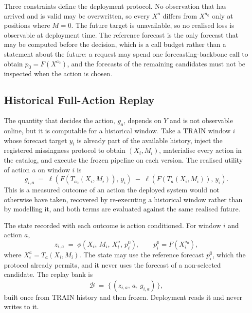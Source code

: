 \documentclass{article}
\newcommand{\calB}{\mathcal{B}}
\newcommand{\loss}{\ell}
\begin{document}
Three constraints define the deployment protocol. No observation that has arrived and is valid
may be overwritten, so every $X^{a}$ differs from $X^{a_0}$ only at positions where $M = 0$.
The future target is unavailable, so no realised loss is observable at deployment time. The
reference forecast is the only forecast that may be computed before the decision, which is a
call budget rather than a statement about the future: a request may spend one
forecasting-backbone call to obtain $p_0 = F(X^{a_0})$, and the forecasts of the remaining
candidates must not be inspected when the action is chosen.

\subsection{Historical Full-Action Replay}
\label{sec:method-replay}
The quantity that decides the action, $g_a$, depends on $Y$ and is not observable online, but
it is computable for a historical window. Take a TRAIN window $i$ whose forecast target $y_i$
is already part of the available history, inject the registered missingness protocol to obtain
$(X_i, M_i)$, materialise every action in the catalog, and execute the frozen pipeline on each
version. The realised utility of action $a$ on window $i$ is
\begin{equation}
  g_{i,a} \;=\; \loss\!\left(F(T_{a_0}(X_i, M_i)),\, y_i\right)
  \;-\; \loss\!\left(F(T_{a}(X_i, M_i)),\, y_i\right).
  \label{eq:replay-gain}
\end{equation}
This is a measured outcome of an action the deployed system would not otherwise have taken,
recovered by re-executing a historical window rather than by modelling it, and both terms are
evaluated against the same realised future.

The state recorded with each outcome is action conditioned. For window $i$ and action $a$,
\begin{equation}
  z_{i,a} \;=\; \phi\!\left(X_i,\, M_i,\, X_i^{a},\, p_i^{0}\right),
  \qquad
  p_i^{0} = F(X_i^{a_0}),
  \label{eq:state}
\end{equation}
where $X_i^{a} = T_a(X_i, M_i)$. The state may use the reference forecast $p_i^0$, which the
protocol already permits, and it never uses the forecast of a non-selected candidate. The
replay bank is
\begin{equation}
  \calB \;=\; \bigl\{\, (z_{i,a},\, a,\, g_{i,a}) \,\bigr\},
  \label{eq:replay-bank}
\end{equation}
built once from TRAIN history and then frozen. Deployment reads it and never writes to it.
\end{document}
